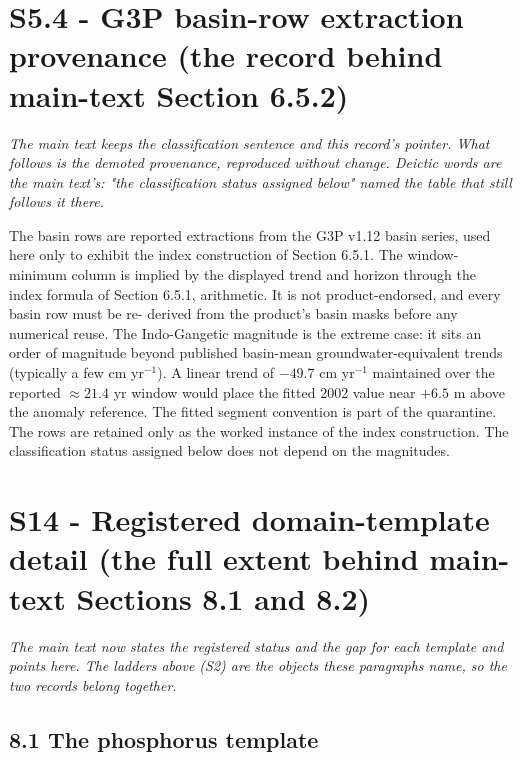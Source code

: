 \documentclass[11pt]{article}
\begin{document}
\section*{S5.4 - G3P basin-row extraction provenance (the record behind main-text Section 6.5.2)}\label{s54---g3p-basin-row-extraction-provenance-the-record-behind-main-text-}

\emph{The main text keeps the classification sentence and this record's pointer. What follows is the demoted provenance, reproduced without change. Deictic words are the main text's: "the classification status assigned below" named the table that still follows it there.}

The basin rows are reported extractions from the G3P v1.12 basin series, used here only to exhibit the index construction of Section 6.5.1. The window-minimum column is implied by the displayed trend and horizon through the index formula of Section 6.5.1, arithmetic. It is not product-endorsed, and every basin row must be re- derived from the product's basin masks before any numerical reuse. The Indo-Gangetic magnitude is the extreme case: it sits an order of magnitude beyond published basin-mean groundwater-equivalent trends (typically a few cm yr\(^{-1}\)). A linear trend of \(-49.7\) cm yr\(^{-1}\) maintained over the reported \(\approx 21.4\) yr window would place the fitted 2002 value near \(+6.5\) m above the anomaly reference. The fitted segment convention is part of the quarantine. The rows are retained only as the worked instance of the index construction. The classification status assigned below does not depend on the magnitudes.

\section*{S14 - Registered domain-template detail (the full extent behind main-text Sections 8.1 and 8.2)}\label{s14---registered-domain-template-detail-the-full-extent-behind-main-te}

\emph{The main text now states the registered status and the gap for each template and points here. The ladders above (S2) are the objects these paragraphs name, so the two records belong together.}

\subsection*{8.1 The phosphorus template}\label{81-the-phosphorus-template}
\end{document}
